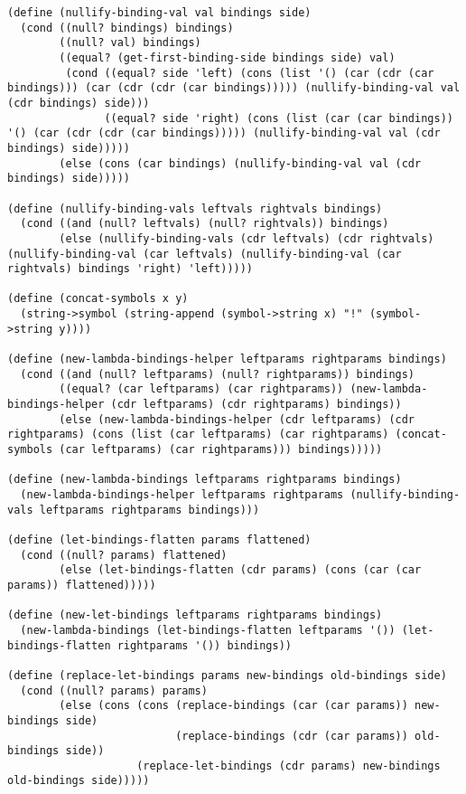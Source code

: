 \documentclass[8pt]{article}
\begin{document}
\begin{verbatim}
(define (nullify-binding-val val bindings side)
  (cond ((null? bindings) bindings)
        ((null? val) bindings)
        ((equal? (get-first-binding-side bindings side) val)
         (cond ((equal? side 'left) (cons (list '() (car (cdr (car bindings))) (car (cdr (cdr (car bindings))))) (nullify-binding-val val (cdr bindings) side)))
               ((equal? side 'right) (cons (list (car (car bindings)) '() (car (cdr (cdr (car bindings))))) (nullify-binding-val val (cdr bindings) side)))))
        (else (cons (car bindings) (nullify-binding-val val (cdr bindings) side)))))

(define (nullify-binding-vals leftvals rightvals bindings)
  (cond ((and (null? leftvals) (null? rightvals)) bindings)
        (else (nullify-binding-vals (cdr leftvals) (cdr rightvals) (nullify-binding-val (car leftvals) (nullify-binding-val (car rightvals) bindings 'right) 'left)))))

(define (concat-symbols x y)
  (string->symbol (string-append (symbol->string x) "!" (symbol->string y))))

(define (new-lambda-bindings-helper leftparams rightparams bindings)
  (cond ((and (null? leftparams) (null? rightparams)) bindings)
        ((equal? (car leftparams) (car rightparams)) (new-lambda-bindings-helper (cdr leftparams) (cdr rightparams) bindings))
        (else (new-lambda-bindings-helper (cdr leftparams) (cdr rightparams) (cons (list (car leftparams) (car rightparams) (concat-symbols (car leftparams) (car rightparams))) bindings)))))

(define (new-lambda-bindings leftparams rightparams bindings)
  (new-lambda-bindings-helper leftparams rightparams (nullify-binding-vals leftparams rightparams bindings)))

(define (let-bindings-flatten params flattened)
  (cond ((null? params) flattened)
        (else (let-bindings-flatten (cdr params) (cons (car (car params)) flattened)))))

(define (new-let-bindings leftparams rightparams bindings)
  (new-lambda-bindings (let-bindings-flatten leftparams '()) (let-bindings-flatten rightparams '()) bindings))

(define (replace-let-bindings params new-bindings old-bindings side)
  (cond ((null? params) params)
        (else (cons (cons (replace-bindings (car (car params)) new-bindings side)
                          (replace-bindings (cdr (car params)) old-bindings side))
                    (replace-let-bindings (cdr params) new-bindings old-bindings side)))))


\end{verbatim}
\end{document}
